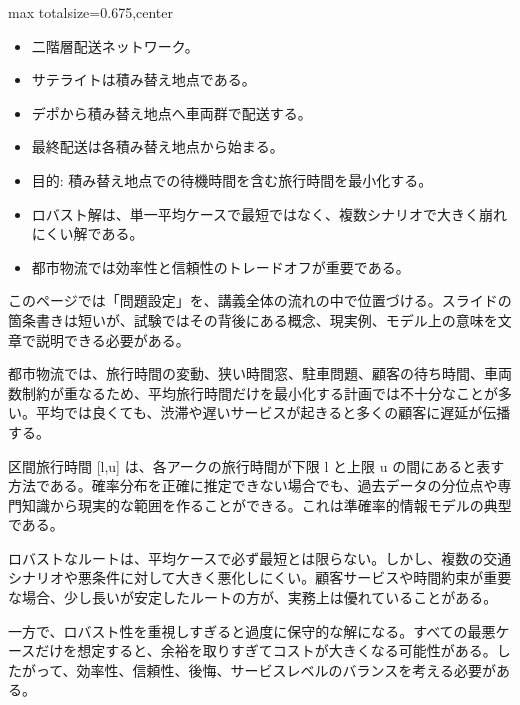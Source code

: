 \clearpage
{}
\begin{adjustbox}{max totalsize={\textwidth}{0.675\textheight},center}
\begin{minipage}{\textwidth}\scriptsize
\begin{minipage}[t]{0.485\textwidth}
\begin{itemize}
\item 二階層配送ネットワーク。
\item サテライトは積み替え地点である。
\item デポから積み替え地点へ車両群で配送する。
\item 最終配送は各積み替え地点から始まる。
\item 目的: 積み替え地点での待機時間を含む旅行時間を最小化する。
\end{itemize}
\begin{itemize}
\item ロバスト解は、単一平均ケースで最短ではなく、複数シナリオで大きく崩れにくい解である。
\item 都市物流では効率性と信頼性のトレードオフが重要である。
\end{itemize}
\end{minipage}\hfill
\begin{minipage}[t]{0.485\textwidth}
このページでは「問題設定」を、講義全体の流れの中で位置づける。スライドの箇条書きは短いが、試験ではその背後にある概念、現実例、モデル上の意味を文章で説明できる必要がある。\par
都市物流では、旅行時間の変動、狭い時間窓、駐車問題、顧客の待ち時間、車両数制約が重なるため、平均旅行時間だけを最小化する計画では不十分なことが多い。平均では良くても、渋滞や遅いサービスが起きると多くの顧客に遅延が伝播する。\par
区間旅行時間 [l,u] は、各アークの旅行時間が下限 l と上限 u の間にあると表す方法である。確率分布を正確に推定できない場合でも、過去データの分位点や専門知識から現実的な範囲を作ることができる。これは準確率的情報モデルの典型である。\par
ロバストなルートは、平均ケースで必ず最短とは限らない。しかし、複数の交通シナリオや悪条件に対して大きく悪化しにくい。顧客サービスや時間約束が重要な場合、少し長いが安定したルートの方が、実務上は優れていることがある。\par
一方で、ロバスト性を重視しすぎると過度に保守的な解になる。すべての最悪ケースだけを想定すると、余裕を取りすぎてコストが大きくなる可能性がある。したがって、効率性、信頼性、後悔、サービスレベルのバランスを考える必要がある。\par

\end{minipage}
\end{minipage}
\end{adjustbox}
